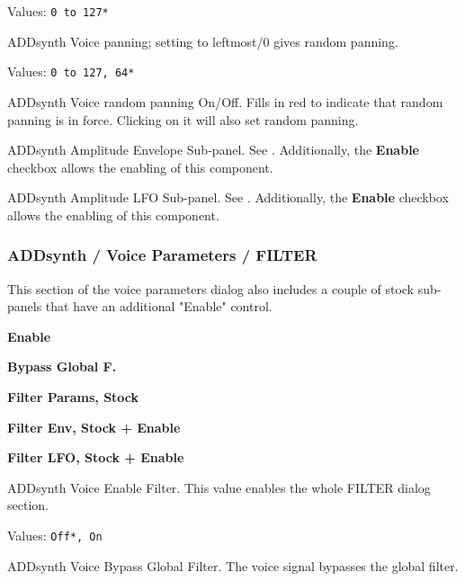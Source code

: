    Values: \texttt{0 to 127*}

   ADDsynth Voice panning; setting to leftmost/0 gives random panning.

   Values: \texttt{0 to 127, 64*}

   ADDsynth Voice random panning On/Off.
   Fills in red to indicate that random panning is in force.
   Clicking on it will also set random panning.

   ADDsynth Amplitude Envelope Sub-panel.
   See .
   Additionally, the \textbf{Enable} checkbox allows the enabling of this
   component.

   ADDsynth Amplitude LFO Sub-panel.
   See .
   Additionally, the \textbf{Enable} checkbox allows the enabling of this
   component.

\subsubsection{ADDsynth / Voice Parameters / FILTER}
\label{subsubsec:addsynth_voice_parameters_filter}

   This section of the voice parameters dialog also includes a couple of
   stock sub-panels that have an additional "Enable" control.

   \begin{enumber}
      \item \textbf{Enable}
      \item \textbf{Bypass Global F.}
      \item \textbf{Filter Params, Stock}
      \item \textbf{Filter Env, Stock + Enable}
      \item \textbf{Filter LFO, Stock + Enable}
   \end{enumber}

   \setcounter{ItemCounter}{0}      %

   ADDsynth Voice Enable Filter.
   This value enables the whole FILTER dialog section.

   Values: \texttt{Off*, On}

   ADDsynth Voice Bypass Global Filter.
   The voice signal bypasses the global filter.

